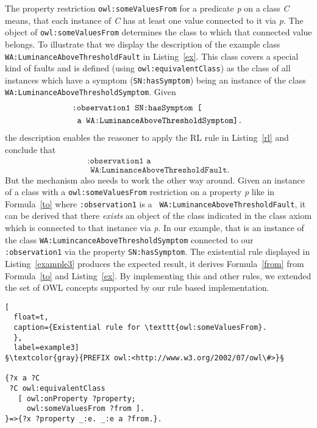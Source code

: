 The property restriction \texttt{owl:someValuesFrom} for a predicate \emph{p} on a class \emph{C} means, that each instance of \emph{C} 
has at least one value connected to it via \emph{p}. 
The object of \texttt{owl:someValuesFrom} determines the class to which 
that connected value belongs.
To illustrate that we display the description of the example class \texttt{WA:LuminanceAboveThresholdFault} in Listing~\ref{ex}. 
This class covers a special kind of faults and is defined (using \texttt{owl:equivalentClass}) as the 
class of all instances which have a symptom (\texttt{SN:hasSymptom}) being an instance of the class \texttt{WA:LuminanceAboveThresholdSymptom}.  
Given
\begin{align}\label{from}
&\hspace{-0.1cm}\texttt{:observation1 SN:hasSymptom [}\notag\\&\hspace{0.1cm}\texttt{a WA:LuminanceAboveThresholdSymptom].}
\end{align}
the description enables the reasoner to apply the RL rule in Listing~\ref{rl} and conclude that
\begin{multline}\label{to} \texttt{:observation1 a}\\\texttt{ WA:LuminanceAboveThresholdFault.}%
\end{multline}
But the mechanism also needs to work the other way around. 
Given an instance of a class with a  \texttt{owl:someValuesFrom} restriction on a property \emph{p}  like in 
Formula~\ref{to} where \texttt{:observation1} is a \texttt{ WA:LuminanceAboveThresholdFault}, it can be derived that there \emph{exists} an 
object 
of the class indicated in the class axiom which is connected to that instance via \emph{p}. 
In our example, that is an instance of the class \texttt{WA:LumincanceAboveThresholdSymptom} connected to our \texttt{:observation1} via the property \texttt{SN:hasSymptom}. 
The existential rule displayed in Listing~\ref{example3} produces the expected result, it derives Formula~\ref{from} from Formula~\ref{to} and Listing~\ref{ex}.  
By implementing this and other rules, we extended the set of OWL  concepts supported by our rule based implementation.
\begin{lstlisting}[
  float=t,
  caption={Existential rule for \texttt{owl:someValuesFrom}. 
  },
  label=example3]
§\textcolor{gray}{PREFIX owl:<http://www.w3.org/2002/07/owl\#>}§
  
{?x a ?C
 ?C owl:equivalentClass 
   [ owl:onProperty ?property; 
     owl:someValuesFrom ?from ].
}=>{?x ?property _:e. _:e a ?from.}.
\end{lstlisting}



